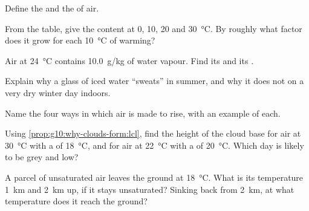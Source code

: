 \begin{exercise}[$\star$]\label{exo:g10:why-clouds-form:1}
Define the  and the  of air.
\end{exercise}

\begin{exercise}[$\star$]\label{exo:g10:why-clouds-form:2}
From the table, give the  content at \num{0}, \num{10},
\num{20} and \qty{30}{\degreeCelsius}. By roughly what factor does it grow
for each \qty{10}{\degreeCelsius} of warming?
\end{exercise}

\begin{exercise}[$\star$]\label{exo:g10:why-clouds-form:3}
Air at \qty{24}{\degreeCelsius} contains \qty{10.0}{g/kg} of water vapour.
Find its  and its .
\end{exercise}

\begin{exercise}[$\star$]\label{exo:g10:why-clouds-form:4}
Explain why a glass of iced water ``sweats'' in summer, and why it does not
on a very dry winter day indoors.
\end{exercise}

\begin{exercise}[$\star$]\label{exo:g10:why-clouds-form:5}
Name the four ways in which air is made to rise, with an example of each.
\end{exercise}

\begin{exercise}[$\star\star$]\label{exo:g10:why-clouds-form:6}
Using \cref{prop:g10:why-clouds-form:lcl}, find the height of the cloud base
for air at \qty{30}{\degreeCelsius} with a  of
\qty{18}{\degreeCelsius}, and for air at \qty{22}{\degreeCelsius} with a  of \qty{20}{\degreeCelsius}. Which day is likely to be grey and low?
\end{exercise}

\begin{exercise}[$\star\star$]\label{exo:g10:why-clouds-form:7}
A parcel of unsaturated air leaves the ground at \qty{18}{\degreeCelsius}.
What is its temperature \qty{1}{km} and \qty{2}{km} up, if it stays
unsaturated? Sinking back from \qty{2}{km}, at what temperature does it
reach the ground?
\end{exercise}

